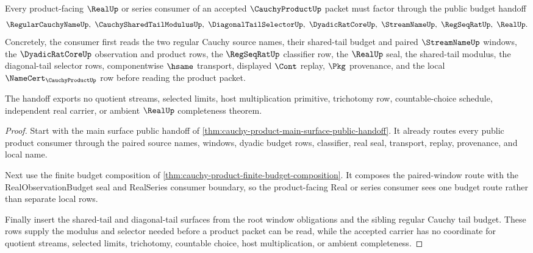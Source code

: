 \begin{theorem}
\label{thm:cauchy-product-budget-public-handoff}
Every product-facing $\RealUp$ or series consumer of an accepted $\CauchyProductUp$ packet must factor through the public budget handoff
$$
\RegularCauchyNameUp,\ \CauchySharedTailModulusUp,\ \DiagonalTailSelectorUp,\ \DyadicRatCoreUp,\ \StreamNameUp,\ \RegSeqRatUp,\ \RealUp .
$$
Concretely, the consumer first reads the two regular Cauchy source names, their shared-tail budget and paired $\StreamNameUp$ windows, the $\DyadicRatCoreUp$ observation and product rows, the $\RegSeqRatUp$ classifier row, the $\RealUp$ seal, the shared-tail modulus, the diagonal-tail selector rows, componentwise $\hsame$ transport, displayed $\Cont$ replay, $\Pkg$ provenance, and the local $\NameCert_{\CauchyProductUp}$ row before reading the product packet.

The handoff exports no quotient streams, selected limits, host multiplication primitive, trichotomy row, countable-choice schedule, independent real carrier, or ambient $\RealUp$ completeness theorem.
\end{theorem}
\begin{proof}
Start with the main surface public handoff of \autoref{thm:cauchy-product-main-surface-public-handoff}. It already routes every public product consumer through the paired source names, windows, dyadic budget rows, classifier, real seal, transport, replay, provenance, and local name.

Next use the finite budget composition of \autoref{thm:cauchy-product-finite-budget-composition}. It composes the paired-window route with the RealObservationBudget seal and RealSeries consumer boundary, so the product-facing Real or series consumer sees one budget route rather than separate local rows.

Finally insert the shared-tail and diagonal-tail surfaces from the root window obligations and the sibling regular Cauchy tail budget. These rows supply the modulus and selector needed before a product packet can be read, while the accepted carrier has no coordinate for quotient streams, selected limits, trichotomy, countable choice, host multiplication, or ambient completeness.
\end{proof}

